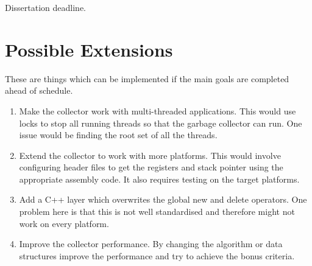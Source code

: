 \documentclass[12pt, a4]{article}
\begin{document}
Dissertation deadline.

\section*{Possible Extensions}

These are things which can be implemented if the main goals are completed ahead of schedule.

\begin{enumerate}

	\item Make the collector work with multi-threaded applications. This would use locks to stop all running threads so that the garbage collector can run. One issue would be finding the root set of all the threads.
	
	\item Extend the collector to work with more platforms. This would involve configuring header files to get the registers and stack pointer using the appropriate assembly code. It also requires testing on the target platforms.
	
	\item Add a C++ layer which overwrites the global new and delete operators. One problem here is that this is not well standardised and therefore might not work on every platform.
	
	\item Improve the collector performance. By changing the algorithm or data structures improve the performance and try to achieve the bonus criteria.

\end{enumerate}
\end{document}
